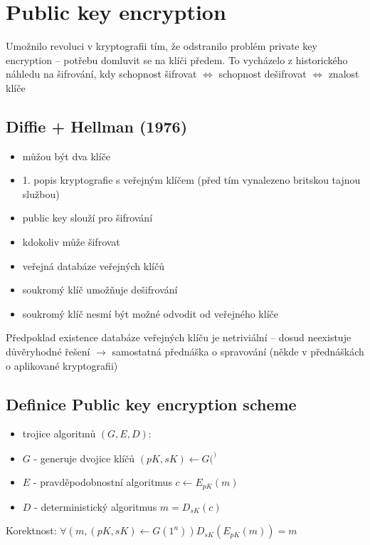 \documentclass{article}
\begin{document}

\section{Public key encryption}

Umožnilo revoluci v kryptografii tím,
že odstranilo problém private key encryption
-- potřebu domluvit se na klíči předem.
To vycházelo z historického náhledu na šifrování,
kdy schopnost šifrovat
$\Leftrightarrow$ schopnost dešifrovat
$\Leftrightarrow$ znalost klíče

\subsection{Diffie + Hellman (1976)}
\begin{itemize}
\item můžou být dva klíče
\item 1. popis kryptografie s veřejným klíčem (před tím vynalezeno britskou tajnou službou)
\item public key slouží pro šifrování
\item kdokoliv může šifrovat
\item veřejná databáze veřejných klíčů
\item soukromý klíč umožňuje dešifrování
\item soukromý klíč nesmí být možné odvodit od veřejného klíče
\end{itemize}

Předpoklad existence databáze veřejných klíču je netriviální
-- dosud neexistuje důvěryhodné řešení $\rightarrow$ samostatná přednáška o spravování (někde v přednáškách o aplikované kryptografii)


\subsection{Definice Public key encryption scheme}
\begin{itemize}
\item trojice algoritmů $(G, E, D)$:
\item $G$ - generuje dvojice klíčů $(pK, sK) \leftarrow G(^)$
\item $E$ - pravděpodobnostní algoritmus $c \leftarrow E_{pK}(m)$
\item $D$ - deterministický algoritmus $m = D_{sK}(c)$
\end{itemize}

Korektnost:
    $\forall (m, (pK, sK) \leftarrow G(1^n)) D_{sK}(E_{pK}(m)) = m$
\end{document}
